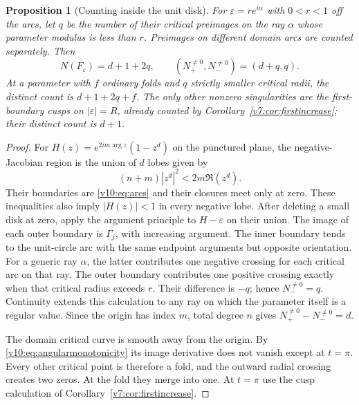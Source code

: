 \documentclass[UTF8,11pt]{ctexart}
\newtheorem{prop}[thm]{Proposition}
\theoremstyle{definition}
\numberwithin{equation}{section}
\begin{document}
\begin{prop}[Counting inside the unit disk]
\label{v10:prop:diskcount}
For $\varepsilon=re^{i\alpha}$ with $0<r<1$ off the arcs,
let $q$ be the number of their critical preimages on the ray
$\alpha$ whose parameter modulus is less than $r$.
Preimages on different domain arcs are counted separately.
Then
\begin{equation}\label{v10:eq:diskcount}
 N(F_\varepsilon)=d+1+2q,
 \qquad (N_+^{\ne0},N_-^{\ne0})=(d+q,q).
\end{equation}
At a parameter with $f$ ordinary folds and $q$ strictly smaller
critical radii, the distinct count is $d+1+2q+f$.
The only other nonzero singularities are the first-boundary
cusps on $|\varepsilon|=R$, already counted by
Corollary~\ref{v7:cor:firstincrease}; their distinct count is $d+1$.
\end{prop}
\begin{proof}
For $H(z)=e^{2im\arg z}(1-z^d)$ on the punctured plane,
the negative-Jacobian region is the union of $d$ lobes given by
\[
 (n+m)|z^d|^2<2m\Re(z^d).
\]
Their boundaries are \eqref{v10:eq:arcs} and their closures meet
only at zero. These inequalities also imply $|H(z)|<1$ in
every negative lobe. After deleting a small disk at zero, apply
the argument principle to $H-\varepsilon$ on their union.
The image of each outer boundary is $\Gamma_j$, with increasing
argument. The inner boundary tends to the unit-circle arc with
the same endpoint arguments but opposite orientation.
For a generic ray $\alpha$, the latter contributes one negative
crossing for each critical arc on that ray. The outer boundary
contributes one positive crossing exactly when that critical
radius exceeds $r$. Their difference is $-q$; hence $N_-^{\ne0}=q$.
Continuity extends this calculation to any ray on which the
parameter itself is a regular value. Since the origin has
index $m$, total degree $n$ gives $N_+^{\ne0}-N_-^{\ne0}=d$.

The domain critical curve is smooth away from the origin.
By \eqref{v10:eq:angularmonotonicity} its image derivative
does not vanish except at $t=\pi$. Every other critical point
is therefore a fold, and the outward radial crossing creates
two zeros. At the fold they merge into one. At $t=\pi$ use
the cusp calculation of Corollary~\ref{v7:cor:firstincrease}.
\end{proof}
\end{document}
